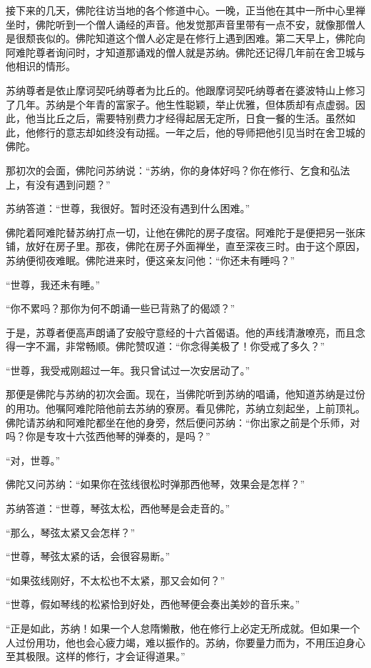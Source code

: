 \documentclass[12pt,twoside,openany]{book}
\begin{document}
接下来的几天，佛陀往访当地的各个修道中心。一晚，正当他在其中一所中心里禅坐时，佛陀听到一个僧人诵经的声音。他发觉那声音里带有一点不安，就像那僧人是很颓丧似的。佛陀知道这个僧人必定是在修行上遇到困难。第二天早上，佛陀向阿难陀尊者询问时，才知道那诵戏的僧人就是苏纳。佛陀还记得几年前在舍卫城与他相识的情形。

苏纳尊者是依止摩诃契吒纳尊者为比丘的。他跟摩诃契吒纳尊者在婆波特山上修习了几年。苏纳是个年青的富家子。他生性聪颖，举止优雅，但体质却有点虚弱。因此，他当比丘之后，需要特别费力才经得起居无定所，日食一餐的生活。虽然如此，他修行的意志却如终没有动摇。一年之后，他的导师把他引见当时在舍卫城的佛陀。

那初次的会面，佛陀问苏纳说：“苏纳，你的身体好吗？你在修行、乞食和弘法上，有没有遇到问题？”

苏纳答道：“世尊，我很好。暂时还没有遇到什么困难。”

佛陀着阿难陀替苏纳打点一切，让他在佛陀的房子度宿。阿难陀于是便把另一张床铺，放好在房子里。那夜，佛陀在房子外面禅坐，直至深夜三时。由于这个原因，苏纳便彻夜难眠。佛陀进来时，便这亲友问他：“你还未有睡吗？”

“世尊，我还未有睡。”

“你不累吗？那你为何不朗诵一些已背熟了的偈颂？”

于是，苏尊者便高声朗诵了安般守意经的十六首偈语。他的声线清澈嘹亮，而且念得一字不漏，非常畅顺。佛陀赞叹道：“你念得美极了！你受戒了多久？”

“世尊，我受戒刚超过一年。我只曾试过一次安居动了。”

那便是佛陀与苏纳的初次会面。现在，当佛陀听到苏纳的唱诵，他知道苏纳是过份的用功。他嘱阿难陀陪他前去苏纳的寮房。看见佛陀，苏纳立刻起坐，上前顶礼。佛陀请苏纳和阿难陀都坐在他的身旁，然后便问苏纳：“你出家之前是个乐师，对吗？你是专攻十六弦西他琴的弹奏的，是吗？”

“对，世尊。”

佛陀又问苏纳：“如果你在弦线很松时弹那西他琴，效果会是怎样？”

苏纳答道：“世尊，琴弦太松，西他琴是会走音的。”

“那么，琴弦太紧又会怎样？”

“世尊，琴弦太紧的话，会很容易断。”

“如果弦线刚好，不太松也不太紧，那又会如何？”

“世尊，假如琴线的松紧恰到好处，西他琴便会奏出美妙的音乐来。”

“正是如此，苏纳！如果一个人怠隋懒散，他在修行上必定无所成就。但如果一个人过份用功，他也会心疲力竭，难以振作的。苏纳，你要量力而为，不用压迫身心至其极限。这样的修行，才会证得道果。”
\end{document}
